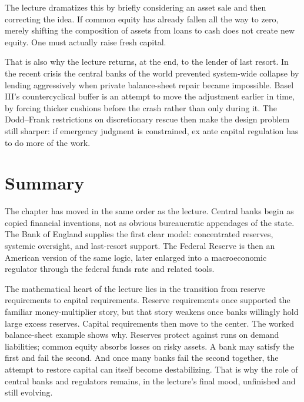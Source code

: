 The lecture dramatizes this by briefly considering an asset sale and then correcting the idea. If common equity has already fallen all the way to zero, merely shifting the composition of assets from loans to cash does not create new equity. One must actually raise fresh capital.

That is also why the lecture returns, at the end, to the lender of last resort. In the recent crisis the central banks of the world prevented system-wide collapse by lending aggressively when private balance-sheet repair became impossible. Basel III's countercyclical buffer is an attempt to move the adjustment earlier in time, by forcing thicker cushions before the crash rather than only during it. The Dodd--Frank restrictions on discretionary rescue then make the design problem still sharper: if emergency judgment is constrained, ex ante capital regulation has to do more of the work.

\section{Summary}

The chapter has moved in the same order as the lecture. Central banks begin as copied financial inventions, not as obvious bureaucratic appendages of the state. The Bank of England supplies the first clear model: concentrated reserves, systemic oversight, and last-resort support. The Federal Reserve is then an American version of the same logic, later enlarged into a macroeconomic regulator through the federal funds rate and related tools.

The mathematical heart of the lecture lies in the transition from reserve requirements to capital requirements. Reserve requirements once supported the familiar money-multiplier story, but that story weakens once banks willingly hold large excess reserves. Capital requirements then move to the center. The worked balance-sheet example shows why. Reserves protect against runs on demand liabilities; common equity absorbs losses on risky assets. A bank may satisfy the first and fail the second. And once many banks fail the second together, the attempt to restore capital can itself become destabilizing. That is why the role of central banks and regulators remains, in the lecture's final mood, unfinished and still evolving.